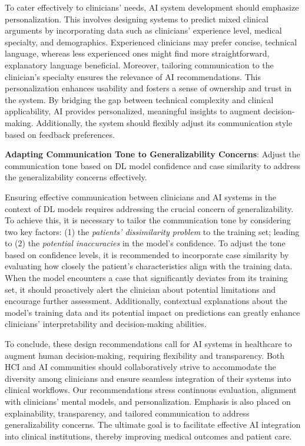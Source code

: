 To cater effectively to clinicians' needs, \ac{AI} system development should emphasize personalization.
This involves designing systems to predict mixed clinical arguments by incorporating data such as clinicians' experience level, medical specialty, and demographics.
Experienced clinicians may prefer concise, technical language, whereas less experienced ones might find more straightforward, explanatory language beneficial.
Moreover, tailoring communication to the clinician's specialty ensures the relevance of \ac{AI} recommendations.
This personalization enhances usability and fosters a sense of ownership and trust in the system.
By bridging the gap between technical complexity and clinical applicability, \ac{AI} provides personalized, meaningful insights to augment decision-making.
Additionally, the system should flexibly adjust its communication style based on feedback preferences.

\vspace{2.00mm}

\noindent
{\bf Adapting Communication Tone to Generalizability Concerns}: Adjust the communication tone based on \ac{DL} model confidence and case similarity to address the generalizability concerns effectively.

\vspace{2.00mm}

Ensuring effective communication between clinicians and \ac{AI} systems in the context of \ac{DL} models requires addressing the crucial concern of generalizability.
To achieve this, it is necessary to tailor the communication tone by considering two key factors:
(1) the {\it patients' dissimilarity problem} to the training set; leading to
(2) the {\it potential inaccuracies} in the model's confidence.
To adjust the tone based on confidence levels, it is recommended to incorporate case similarity by evaluating how closely the patient's characteristics align with the training data.
When the model encounters a case that significantly deviates from its training set, it should proactively alert the clinician about potential limitations and encourage further assessment.
Additionally, contextual explanations about the model's training data and its potential impact on predictions can greatly enhance clinicians' interpretability and decision-making abilities.

To conclude, these design recommendations call for \ac{AI} systems in healthcare to augment human decision-making, requiring flexibility and transparency.
Both \ac{HCI} and \ac{AI} communities should collaboratively strive to accommodate the diversity among clinicians and ensure seamless integration of their systems into clinical workflows.
Our recommendations stress continuous evaluation, alignment with clinicians' mental models, and personalization.
Emphasis is also placed on explainability, transparency, and tailored communication to address generalizability concerns.
The ultimate goal is to facilitate effective \ac{AI} integration into clinical institutions, thereby improving medical outcomes and patient care.

